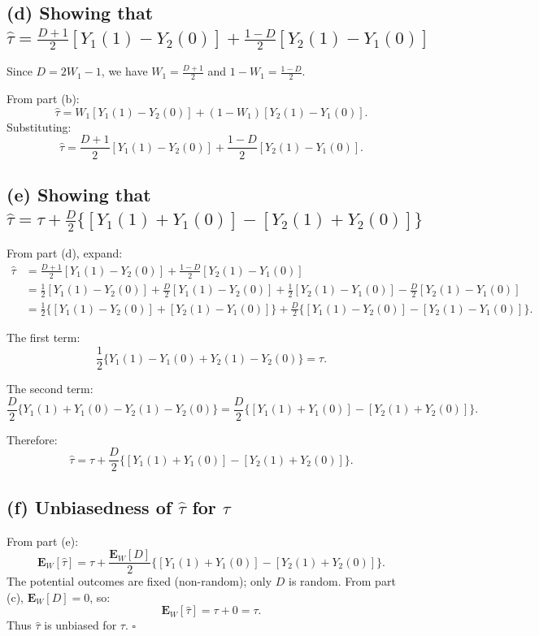 \documentclass[11pt]{article}
\begin{document}
\subsection*{(d) Showing that $\hat{\tau} = \frac{D+1}{2}[Y_1(1) - Y_2(0)] + \frac{1-D}{2}[Y_2(1) - Y_1(0)]$}

Since $D = 2W_1 - 1$, we have $W_1 = \frac{D+1}{2}$ and $1-W_1 = \frac{1-D}{2}$.

From part (b):
\[
  \hat{\tau} = W_1[Y_1(1) - Y_2(0)] + (1-W_1)[Y_2(1) - Y_1(0)].
\]
Substituting:
\[
  \boxed{\hat{\tau} = \frac{D+1}{2}[Y_1(1) - Y_2(0)] + \frac{1-D}{2}[Y_2(1) - Y_1(0)].}
\]

\subsection*{(e) Showing that $\hat{\tau} = \tau + \frac{D}{2}\{[Y_1(1)+Y_1(0)] - [Y_2(1)+Y_2(0)]\}$}

From part (d), expand:
\begin{align*}
  \hat{\tau} &= \frac{D+1}{2}[Y_1(1) - Y_2(0)] + \frac{1-D}{2}[Y_2(1) - Y_1(0)] \\
  &= \frac{1}{2}[Y_1(1) - Y_2(0)] + \frac{D}{2}[Y_1(1) - Y_2(0)] + \frac{1}{2}[Y_2(1) - Y_1(0)] - \frac{D}{2}[Y_2(1) - Y_1(0)] \\
  &= \frac{1}{2}\{[Y_1(1) - Y_2(0)] + [Y_2(1) - Y_1(0)]\} + \frac{D}{2}\{[Y_1(1) - Y_2(0)] - [Y_2(1) - Y_1(0)]\}.
\end{align*}

The first term:
\[
  \frac{1}{2}\{Y_1(1) - Y_1(0) + Y_2(1) - Y_2(0)\} = \tau.
\]

The second term:
\[
  \frac{D}{2}\{Y_1(1) + Y_1(0) - Y_2(1) - Y_2(0)\} = \frac{D}{2}\{[Y_1(1)+Y_1(0)] - [Y_2(1)+Y_2(0)]\}.
\]

Therefore:
\[
  \boxed{\hat{\tau} = \tau + \frac{D}{2}\{[Y_1(1)+Y_1(0)] - [Y_2(1)+Y_2(0)]\}.}
\]

\subsection*{(f) Unbiasedness of $\hat{\tau}$ for $\tau$}

From part (e):
\[
  \mathbf{E}_W[\hat{\tau}] = \tau + \frac{\mathbf{E}_W[D]}{2}\{[Y_1(1)+Y_1(0)] - [Y_2(1)+Y_2(0)]\}.
\]
The potential outcomes are fixed (non-random); only $D$ is random. From part (c), $\mathbf{E}_W[D] = 0$, so:
\[
  \mathbf{E}_W[\hat{\tau}] = \tau + 0 = \tau.
\]
Thus $\hat{\tau}$ is unbiased for $\tau$. $\square$
\end{document}

